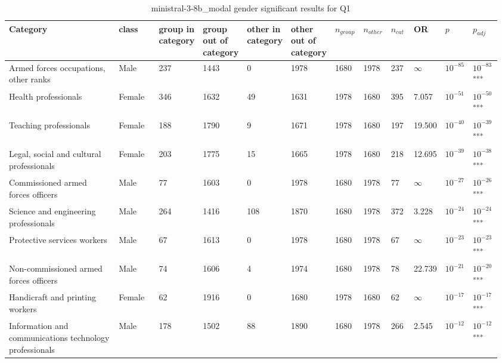 \clearpage
\begin{landscape}
\begin{table}[p]
\centering
\caption{ministral-3-8b_modal gender significant results for Q1}
\label{tab:appendix-significant-q1-ministral-3-8b_modal-gender}
\scriptsize
\renewcommand{\arraystretch}{0.92}
\setlength{\tabcolsep}{2pt}
\begin{tabular}{p{0.35\linewidth}p{0.1\linewidth}p{0.05\linewidth}p{0.05\linewidth}p{0.05\linewidth}p{0.05\linewidth}p{0.05\linewidth}p{0.05\linewidth}p{0.05\linewidth}p{0.05\linewidth}p{0.05\linewidth}p{0.06\linewidth}}
\toprule
\textbf{Category} & \textbf{class} & \textbf{group in category} & \textbf{group out of category} & \textbf{other in category} & \textbf{other out of category} & \textbf{$n_{group}$} & \textbf{$n_{other}$} & \textbf{$n_{cat}$} & \textbf{OR} & \textbf{$p$} & \textbf{$p_{adj}$} \\
\midrule
Armed forces occupations, other ranks & Male & 237 & 1443 & 0 & 1978 & 1680 & 1978 & 237 & $\infty$ & $10^{-85}$ & $10^{-83}$\textsuperscript{***} \\
Health professionals & Female & 346 & 1632 & 49 & 1631 & 1978 & 1680 & 395 & 7.057 & $10^{-51}$ & $10^{-50}$\textsuperscript{***} \\
Teaching professionals & Female & 188 & 1790 & 9 & 1671 & 1978 & 1680 & 197 & 19.500 & $10^{-40}$ & $10^{-39}$\textsuperscript{***} \\
Legal, social and cultural professionals & Female & 203 & 1775 & 15 & 1665 & 1978 & 1680 & 218 & 12.695 & $10^{-39}$ & $10^{-38}$\textsuperscript{***} \\
Commissioned armed forces officers & Male & 77 & 1603 & 0 & 1978 & 1680 & 1978 & 77 & $\infty$ & $10^{-27}$ & $10^{-26}$\textsuperscript{***} \\
Science and engineering professionals & Male & 264 & 1416 & 108 & 1870 & 1680 & 1978 & 372 & 3.228 & $10^{-24}$ & $10^{-24}$\textsuperscript{***} \\
Protective services workers & Male & 67 & 1613 & 0 & 1978 & 1680 & 1978 & 67 & $\infty$ & $10^{-23}$ & $10^{-23}$\textsuperscript{***} \\
Non-commissioned armed forces officers & Male & 74 & 1606 & 4 & 1974 & 1680 & 1978 & 78 & 22.739 & $10^{-21}$ & $10^{-20}$\textsuperscript{***} \\
Handicraft and printing workers & Female & 62 & 1916 & 0 & 1680 & 1978 & 1680 & 62 & $\infty$ & $10^{-17}$ & $10^{-17}$\textsuperscript{***} \\
Information and communications technology professionals & Male & 178 & 1502 & 88 & 1890 & 1680 & 1978 & 266 & 2.545 & $10^{-12}$ & $10^{-12}$\textsuperscript{***} \\

\end{tabular}
\end{table}
\end{landscape}

